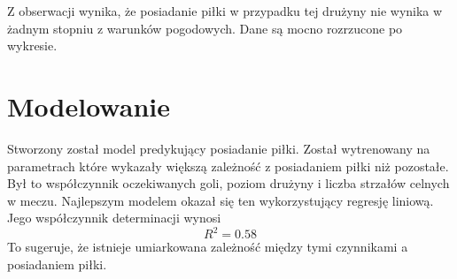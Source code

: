 \documentclass[11pt]{article}
\begin{document}
\begin{enumerate}[label=\alph*)]
    Z obserwacji wynika, że posiadanie piłki w przypadku tej drużyny nie wynika w żadnym stopniu z warunków pogodowych. Dane są mocno rozrzucone po wykresie.
    
\end{enumerate}

\section{Modelowanie}

    Stworzony został model predykujący posiadanie piłki. Został wytrenowany na parametrach które wykazały większą zależność z posiadaniem piłki niż pozostałe. Był to współczynnik oczekiwanych goli, poziom drużyny i liczba strzałów celnych w meczu. Najlepszym modelem okazał się ten wykorzystujący regresję liniową. Jego współczynnik determinacji wynosi
    \begin{equation}
    R^2 = 0.58
    \end{equation}
    To sugeruje, że istnieje umiarkowana zależność między tymi czynnikami a posiadaniem piłki.
    
\end{document}
